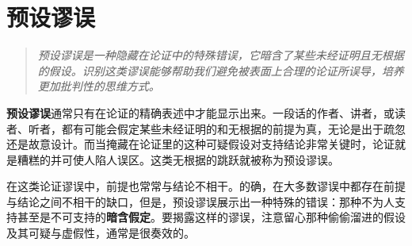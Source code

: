 \section{预设谬误}

\begin{quotation}
\textit{预设谬误是一种隐藏在论证中的特殊错误，它暗含了某些未经证明且无根据的假设。识别这类谬误能够帮助我们避免被表面上合理的论证所误导，培养更加批判性的思维方式。}
\end{quotation}

\textbf{预设谬误}通常只有在论证的精确表述中才能显示出来。一段话的作者、讲者，或读者、听者，都有可能会假定某些未经证明的和无根据的前提为真，无论是出于疏忽还是故意设计。而当掩藏在论证里的这种可疑假设对支持结论非常关键时，论证就是糟糕的并可使人陷人误区。这类无根据的跳跃就被称为预设谬误。

在这类论证谬误中，前提也常常与结论不相干。的确，在大多数谬误中都存在前提与结论之间不相干的缺口，但是，预设谬误展示出一种特殊的错误：那种不为人支持甚至是不可支持的\textbf{暗含假定}。要揭露这样的谬误，注意留心那种偷偷溜进的假设及其可疑与虚假性，通常是很奏效的。 